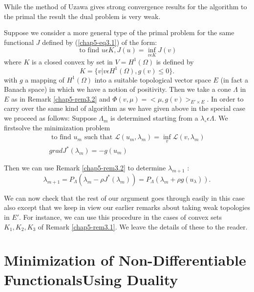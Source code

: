 \begin{remark}\label{chap5-rem3.5}
While the method of Uzawa gives strong convergence results for the algorithm to the primal the result the dual problem is very weak.
\end{remark}

\setcounter{remark}{6}
\begin{remark}\label{chap5-rem3.7}
Suppose we consider a more general type of the primal problem for the same functional $J$ defined by (\ref{chap5-eq3.1}) of the form:
$$
\text{ to find } u \epsilon K, J(u) = \inf_{v \epsilon K} J(v)
$$\pageoriginale
where $K$ is a closed convex by set in $V = H^{1} (\Omega)$ is defined by
$$
K = \{v | v \epsilon H^{1}(\Omega), g(v) \leq 0 \}.
$$
with $g$ a mapping of $H^{1} (\Omega)$ into a suitable topological vector space $E$ (in fact a Banach space) in which we have a notion of positivity. Then we take a cone $\Lambda$ in $E$ as in Remark \ref{chap5-rem3.2} and $\Phi(v, \mu) = <\mu, g(v)>_{E' \times E}$. In order to carry over the same kind of algorithm as we have given above in the special case we proceed as follows: Suppose $\Lambda_{m}$ is determined starting from a $\lambda_{\circ} \epsilon \Lambda$. We firstsolve the minimization problem
\begin{align*}
\text{ to find } u_{m} \text{ such that } \mathscr{L} (u_{m}, \lambda_{m}) = \inf_{v} \mathscr{L} (v, \lambda_{m})\\
grad J^{*} (\lambda_{m}) = -g(u_{m})
\end{align*}

Then we can use Remark \ref{chap5-rem3.2} to determine $\lambda_{m+1}$ :
$$
\lambda_{m+1} = P_{\Lambda}  (\lambda_{m} - \rho J^{*} (\lambda_{m})) = P_{\Lambda}(\lambda_{m} + \rho g(u_{\lambda})).
$$
\end{remark}

We can now check that the rest of our argument goes through easily in this case also except that we keep in view our earlier remarks about taking weak topologies in $E'$. For instance, we can use this procedure in the cases of convex sets $K_{1}, K_{2}, K_{3}$ of Remark \ref{chap5-rem3.1}. We leave the details of these to the reader.

\section[Minimization of Non-Differentiable
  Functionals...]{Minimization of Non-Differentiable
  Functionals\hfil\break Using Duality}\label{chap5-sec4} 

